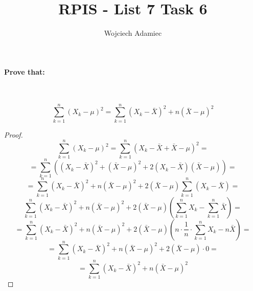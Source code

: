 \documentclass[12pt,oneside,a4paper]{article}
\author{Wojciech Adamiec}
\title{
    \textbf{RPIS - List 7 Task 6}\\
}
\begin{document}
\maketitle

\paragraph{Prove that:}\

$$\sum^n_{k=1}{(X_k - \mu)^2} = \sum^n_{k=1}{(X_k - \bar{X})^2} + n(\bar{X}-\mu)^2$$

\begin{proof}
$$\sum^n_{k=1}{(X_k - \mu)^2} = \sum^n_{k=1}{(X_k - \bar{X} + \bar{X}- \mu)^2} =$$
$$= \sum^n_{k=1}{((X_k - \bar{X})^2 + (\bar{X}- \mu)^2 + 2(X_k - \bar{X})(\bar{X}-\mu))} =$$
$$=\sum^n_{k=1}{(X_k - \bar{X})^2} + n(\bar{X}- \mu)^2 + 2(\bar{X}-\mu)\sum^n_{k=1}(X_k - \bar{X}) =$$
$$ \sum^n_{k=1}{(X_k - \bar{X})^2 + n(\bar{X}- \mu)^2 + 2(\bar{X}-\mu)(\sum^n_{k=1}X_k - \sum^n_{k=1}\bar{X})}=$$
$$= \sum^n_{k=1}{(X_k - \bar{X})^2} + n(\bar{X}- \mu)^2 + 2(\bar{X}-\mu)(n \cdot \frac{1}{n} \cdot \sum^n_{k=1}X_k - n\bar{X}) =$$
$$= \sum^n_{k=1}{(X_k - \bar{X})^2} + n(\bar{X}- \mu)^2 + 2(\bar{X}-\mu)\cdot 0 =$$
$$= \sum^n_{k=1}{(X_k - \bar{X})^2} + n(\bar{X} - \mu)^2$$
\end{proof}
\end{document}
